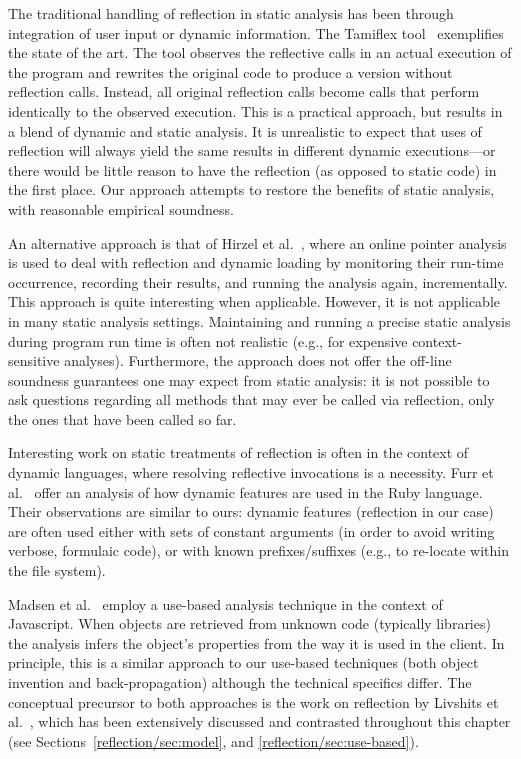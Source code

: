 The traditional handling of reflection in static analysis has been
through integration of user input or dynamic information.  The
Tamiflex tool~\cite{icse/BoddenSSOM11} exemplifies the state of the
art. The tool observes the reflective calls in an actual execution of
the program and rewrites the original code to produce a version
without reflection calls. Instead, all original reflection calls
become calls that perform identically to the observed execution. This
is a practical approach, but results in a blend of dynamic and static
analysis.
It is unrealistic to expect that uses of reflection will always yield
the same results in different dynamic executions---or there would be
little reason to have the reflection (as opposed to static code) in
the first place. Our approach attempts to restore the benefits of
static analysis, with reasonable empirical soundness.

An alternative approach is that of Hirzel et
al.~\cite{ecoop/HirzelDH04,toplas/HirzelDDH07}, where an online
pointer analysis is used to deal with reflection and dynamic loading
by monitoring their run-time occurrence, recording their results, and
running the analysis again, incrementally. This approach is quite
interesting when applicable. However, it is not applicable in many
static analysis settings. Maintaining and running a precise static
analysis during program run time is often not realistic (e.g., for
expensive context-sensitive analyses). Furthermore, the approach does
not offer the off-line soundness guarantees one may expect from static
analysis: it is not possible to ask questions regarding all methods
that may ever be called via reflection, only the ones that have been
called so far.

Interesting work on static treatments of reflection is often in the
context of dynamic languages, where resolving reflective invocations
is a necessity.  Furr et al.~\cite{oopsla/FurrAF09} offer an analysis
of how dynamic features are used in the Ruby language. Their
observations are similar to ours: dynamic features (reflection in our
case) are often used either with sets of constant arguments (in order
to avoid writing verbose, formulaic code), or with known
prefixes/suffixes (e.g., to re-locate within the file system).

Madsen et al.~\cite{sigsoft/MadsenLF13} employ a use-based analysis
technique in the context of Javascript. When objects are retrieved
from unknown code (typically libraries) the analysis infers the
object's properties from the way it is used in the client. In
principle, this is a similar approach to our use-based techniques
(both object invention and back-propagation) although the technical
specifics differ. The conceptual precursor to both approaches is the
work on reflection by Livshits et
al.~\cite{aplas/LivshitsWL05,livshits:thesis}, which has been
extensively discussed and contrasted throughout this chapter (see
Sections~\ref{reflection/sec:model}, and \ref{reflection/sec:use-based}).

